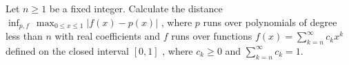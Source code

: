 Let $n\ge 1$  be a fixed integer. Calculate the distance $\inf_{p,f}\, \max_{0\le x\le 1} |f(x)-p(x)|$  , where $p$  runs over polynomials of degree less than $n$  with real coefficients and $f$  runs over functions $f(x)= \sum_{k=n}^{\infty} c_k x^k$   defined on the closed interval $[0,1]$ , where $c_k \ge 0$  and $\sum_{k=n}^{\infty} c_k=1$.